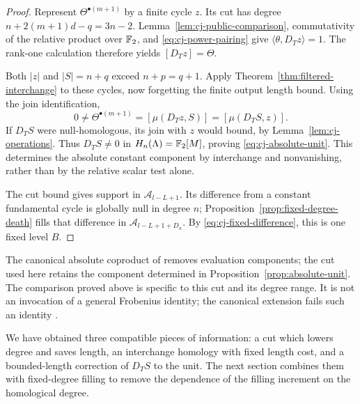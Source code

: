 \begin{proof}
Represent $\Theta^{\bullet(m+1)}$ by a finite cycle $z$.
Its cut has degree
$n+2(m+1)d-q=3n-2$.  Lemma~\ref{lem:cj-public-comparison},
commutativity of the relative product over $\mathbb F_2$, and
\eqref{eq:cj-power-pairing} give
$\langle\theta,D_Tz\rangle=1$.  The rank-one calculation
therefore yields $[D_Tz]=\Theta$.

Both $|z|$ and $|S|=n+q$ exceed $n+p=q+1$.
Apply Theorem~\ref{thm:filtered-interchange} to these cycles,
now forgetting the finite output length bound.  Using the join
identification,
\[
 0\ne\Theta^{\bullet(m+1)}
   =[\mu(D_Tz,S)]=[\mu(D_TS,z)].
\]
If $D_TS$ were null-homologous, its join with $z$ would bound,
by Lemma~\ref{lem:cj-operations}.  Thus $D_TS\ne0$ in
$H_n(\Lambda)=\mathbb F_2[M]$, proving \eqref{eq:cj-absolute-unit}.
This determines the absolute constant component by interchange
and nonvanishing, rather than by the relative scalar test alone.

The cut bound gives support in $\mathcal A_{l-L+1}$.  Its difference
from a constant fundamental cycle is globally null in degree
$n$; Proposition~\ref{prop:fixed-degree-death} fills that
difference in $\mathcal A_{l-L+1+D_n}$.  By
\eqref{eq:cj-fixed-difference}, this is one fixed level $B$.
\end{proof}

The canonical absolute coproduct of
\cite[Theorem~B]{HingstonWahl2023} removes evaluation components;
the cut used here retains the component determined in
Proposition~\ref{prop:absolute-unit}.  The comparison proved
above is specific to this cut and its degree range.  It is not
an invocation of a general Frobenius identity; the canonical
extension fails such an identity
\cite[Remark~4.14]{HingstonWahl2023}.

We have obtained three compatible pieces of information: a cut
which lowers degree and saves length, an interchange homology
with fixed length cost, and a bounded-length correction of
$D_TS$ to the unit.  The next section combines them with
fixed-degree filling to remove the dependence of the filling
increment on the homological degree.
